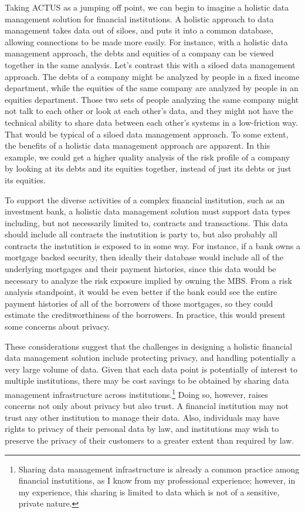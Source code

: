 \documentclass[11pt]{article}
\begin{document}
Taking ACTUS as a jumping off point, we can begin to imagine a holistic data
management solution for financial institutions. A holistic approach to data
management takes data out of siloes, and puts it into a common database, allowing
connections to be made more easily. For instance, with a holistic data management
approach, the debts and equities of a company can be viewed together in the same
analysis. Let's contrast this with a siloed data management approach.
The debts of a company might be
analyzed by people in a fixed income department, while the equities of the same
company are analyzed by people in an equities department. Those two sets of
people analyzing the same company might not talk to each other or look at each
other's data, and they might not have the technical ability to share data
between each other's systems in a low-friction way. That would be typical of a
siloed data management approach. To some extent, the benefits of a holistic
data management approach are apparent. In this example, we could get a higher
quality analysis of the risk profile of a company by looking at its debts
and its equities together, instead of just its debts or just its equities.

To support the diverse activities of a complex financial institution, such
as an investment bank, a holistic data management solution must support data
types including, but not necessarily limited to, contracts and transactions.
This data should include all contracts the instutition is party to, but also
probably all contracts the instutition is exposed to in some way. For instance,
if a bank owns a mortgage backed security, then ideally their database would
include all of the underlying mortgages and their payment histories, since this
data would be necessary to analyze the risk exposure implied by owning the MBS.
From a risk analysis standpoint, it would be even better if the bank could see
the entire payment histories of all of the borrowers of those mortgages, so they
could estimate the creditworthiness of the borrowers. In practice, this would
present some concerns about privacy.

These considerations suggest that the challenges in designing a holistic financial
data management solution include protecting privacy, and handling potentially
a very large volume of data. Given that each data point is potentially of interest
to multiple institutions, there may be cost savings to be obtained by sharing
data management infrastructure across institutions.\footnote{Sharing data management
infrastructure is already a common practice among financial instutitions, as
I know from my professional experience; however, in my experience, this sharing
is limited to data which is not of a sensitive, private nature.}
Doing so, however, raises concerns not only about privacy but also trust.
A financial institution may not
trust any other institution to manage their data. Also, individuals may have
rights to privacy of their personal data by law, and institutions may wish to
preserve the privacy of their customers to a greater extent than required by law.
\end{document}

